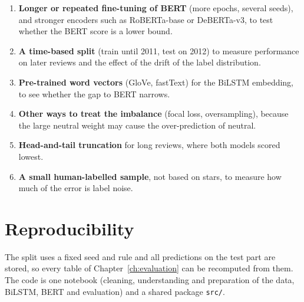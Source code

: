 \begin{enumerate}
    \item \textbf{Longer or repeated fine-tuning of BERT} (more epochs, several seeds), and stronger encoders such as RoBERTa-base or DeBERTa-v3, to test whether the BERT score is a lower bound.
    \item \textbf{A time-based split} (train until 2011, test on 2012) to measure performance on later reviews and the effect of the drift of the label distribution.
    \item \textbf{Pre-trained word vectors} (GloVe, fastText) for the BiLSTM embedding, to see whether the gap to BERT narrows.
    \item \textbf{Other ways to treat the imbalance} (focal loss, oversampling), because the large neutral weight may cause the over-prediction of neutral.
    \item \textbf{Head-and-tail truncation} for long reviews, where both models scored lowest.
    \item \textbf{A small human-labelled sample}, not based on stars, to measure how much of the error is label noise.
\end{enumerate}

\section{Reproducibility}
\label{sec:8-4}

The split uses a fixed seed and rule and all predictions on the test part are stored, so every table of Chapter~\ref{ch:evaluation} can be recomputed from them. The code is one notebook (cleaning, understanding and preparation of the data, BiLSTM, BERT and evaluation) and a shared package \texttt{src/}.
